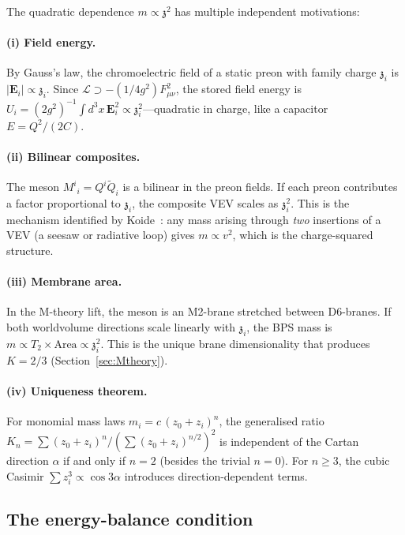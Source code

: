 \documentclass[12pt,a4paper]{article}
\newcommand{\zch}{\mathfrak{z}}
\begin{document}
The quadratic dependence $m \propto \zch^2$ has multiple
independent motivations:

\paragraph{(i) Field energy.}
By Gauss's law, the chromoelectric field of a static preon
with family charge $\zch_i$ is $|\mathbf{E}_i| \propto \zch_i$.
Since $\mathcal{L} \supset -(1/4g^2)F_{\mu\nu}^2$, the stored
field energy is
$U_i = (2g^2)^{-1}\int d^3x\,\mathbf{E}_i^2 \propto \zch_i^2$---quadratic in charge, like a capacitor $E = Q^2/(2C)$.

\paragraph{(ii) Bilinear composites.}
The meson $M^i{}_i = Q^i\tilde{Q}_i$ is a bilinear in the preon
fields.
If each preon contributes a factor proportional to $\zch_i$,
the composite VEV scales as $\zch_i^2$.
This is the mechanism identified by Koide~\cite{Koide:1990}:
any mass arising through \emph{two} insertions of a VEV
(a seesaw or radiative loop) gives $m \propto v^2$, which is
the charge-squared structure.

\paragraph{(iii) Membrane area.}
In the M-theory lift, the meson is an M2-brane stretched
between D6-branes.
If both worldvolume directions scale linearly with $\zch_i$,
the BPS mass is $m \propto T_2 \times \text{Area}
\propto \zch_i^2$.
This is the unique brane dimensionality that produces
$K = 2/3$ (Section~\ref{sec:Mtheory}).

\paragraph{(iv) Uniqueness theorem.}
For monomial mass laws $m_i = c\,(z_0 + z_i)^n$, the
generalised ratio
$K_n = \sum (z_0{+}z_i)^n / (\sum (z_0{+}z_i)^{n/2})^2$
is independent of the Cartan direction $\alpha$ if and only
if $n = 2$ (besides the trivial $n = 0$).
For $n \geq 3$, the cubic Casimir
$\sum z_i^3 \propto \cos 3\alpha$ introduces
direction-dependent terms.

\subsection{The energy-balance condition}
\end{document}
